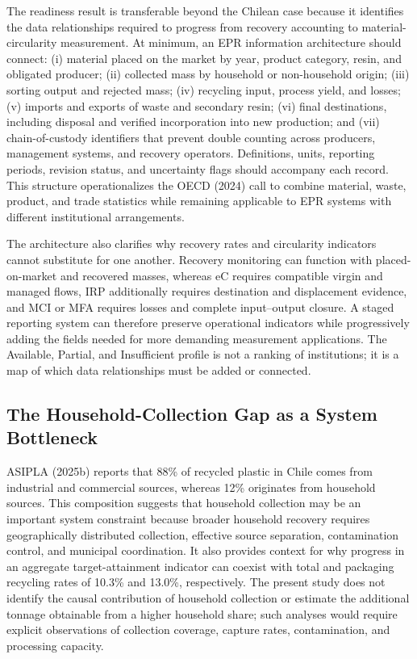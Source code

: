 \documentclass[review,10pt]{elsarticle}
\newcommand{\changepar}[1]{#1\par\medskip}
\begin{document}
\changepar{The readiness result is transferable beyond the Chilean case because it identifies the data relationships required to progress from recovery accounting to material-circularity measurement. At minimum, an EPR information architecture should connect: (i) material placed on the market by year, product category, resin, and obligated producer; (ii) collected mass by household or non-household origin; (iii) sorting output and rejected mass; (iv) recycling input, process yield, and losses; (v) imports and exports of waste and secondary resin; (vi) final destinations, including disposal and verified incorporation into new production; and (vii) chain-of-custody identifiers that prevent double counting across producers, management systems, and recovery operators. Definitions, units, reporting periods, revision status, and uncertainty flags should accompany each record. This structure operationalizes the OECD (2024) call to combine material, waste, product, and trade statistics while remaining applicable to EPR systems with different institutional arrangements.}

\changepar{The architecture also clarifies why recovery rates and circularity indicators cannot substitute for one another. Recovery monitoring can function with placed-on-market and recovered masses, whereas eC requires compatible virgin and managed flows, IRP additionally requires destination and displacement evidence, and MCI or MFA requires losses and complete input--output closure. A staged reporting system can therefore preserve operational indicators while progressively adding the fields needed for more demanding measurement applications. The Available, Partial, and Insufficient profile is not a ranking of institutions; it is a map of which data relationships must be added or connected.}

\subsection{The Household-Collection Gap as a System Bottleneck}

\changepar{ASIPLA (2025b) reports that 88\% of recycled plastic in Chile comes from industrial and commercial sources, whereas 12\% originates from household sources. This composition suggests that household collection may be an important system constraint because broader household recovery requires geographically distributed collection, effective source separation, contamination control, and municipal coordination. It also provides context for why progress in an aggregate target-attainment indicator can coexist with total and packaging recycling rates of 10.3\% and 13.0\%, respectively. The present study does not identify the causal contribution of household collection or estimate the additional tonnage obtainable from a higher household share; such analyses would require explicit observations of collection coverage, capture rates, contamination, and processing capacity.}
\end{document}
